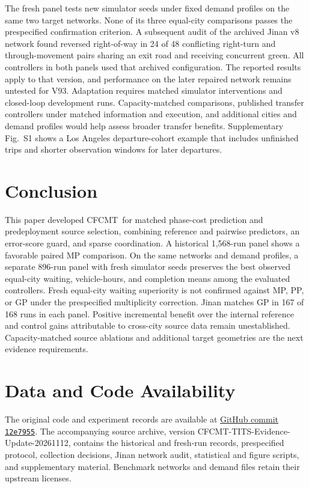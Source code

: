 \documentclass[letterpaper,journal]{IEEEtran}
\newcommand{\method}{CFCMT}
\begin{document}
The fresh panel tests new simulator seeds under fixed demand profiles on the same two target networks. None of its three equal-city comparisons passes the prespecified confirmation criterion. A subsequent audit of the archived Jinan v8 network found reversed right-of-way in 24 of 48 conflicting right-turn and through-movement pairs sharing an exit road and receiving concurrent green. All controllers in both panels used that archived configuration. The reported results apply to that version, and performance on the later repaired network remains untested for V93. Adaptation requires matched simulator interventions and closed-loop development runs. Capacity-matched comparisons, published transfer controllers under matched information and execution, and additional cities and demand profiles would help assess broader transfer benefits. Supplementary Fig.~S1 shows a Los Angeles departure-cohort example that includes unfinished trips and shorter observation windows for later departures.

\section{Conclusion}
\label{sec:conclusion}
This paper developed \method\ for matched phase-cost prediction and predeployment source selection, combining reference and pairwise predictors, an error-score guard, and sparse coordination. A historical 1,568-run panel shows a favorable paired MP comparison. On the same networks and demand profiles, a separate 896-run panel with fresh simulator seeds preserves the best observed equal-city waiting, vehicle-hours, and completion means among the evaluated controllers. Fresh equal-city waiting superiority is not confirmed against MP, PP, or GP under the prespecified multiplicity correction. Jinan matches GP in 167 of 168 runs in each panel. Positive incremental benefit over the internal reference and control gains attributable to cross-city source data remain unestablished. Capacity-matched source ablations and additional target geometries are the next evidence requirements.

\section*{Data and Code Availability}
\begingroup\raggedright
The original code and experiment records are available at \href{https://github.com/erzhu419/CFCMT/tree/12e7955d0350e4cac2a344d04954cfb5efea70a2}{GitHub commit \texttt{12e7955}}. The accompanying source archive, version CFCMT-TITS-Evidence-Update-20261112, contains the historical and fresh-run records, prespecified protocol, collection decisions, Jinan network audit, statistical and figure scripts, and supplementary material. Benchmark networks and demand files retain their upstream licenses.
\par\endgroup
\end{document}
